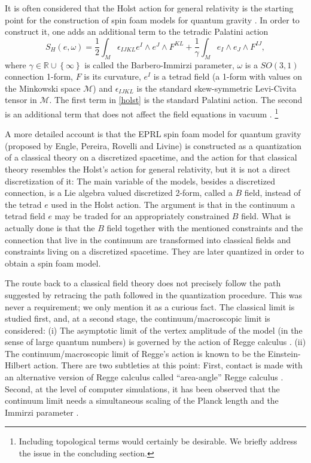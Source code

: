 \documentclass{article}
\begin{document}
It is often considered that the Holst action \cite{Holst, EPRL} for general relativity is the starting point for the construction of spin foam models for quantum gravity \cite{Perez1}. 
In order to construct it, one adds 
an additional term to the tetradic Palatini action 
\begin{equation}\label{holst}
	S_{H}(e,\omega)=\dfrac{1}{2}\int_{M}\epsilon_{IJKL}e^{I}\wedge e^{J}\wedge F^{KL}+\dfrac{1}{\gamma}\int_{M}e_{I}\wedge e_{J}\wedge F^{IJ},
\end{equation}	
where $\gamma\in\mathbb{R}\cup\left\{\infty\right\}$ is called the Barbero-Immirzi parameter, $\omega$ is a $SO(3,1)$ connection 1-form, $F$ is its curvature, $e^{I}$ is a tetrad field (a 1-form with values on the Minkowski space $\mathcal{M}$) and $\epsilon_{IJKL}$ is the standard skew-symmetric Levi-Civita tensor in $\mathcal{M}$. The first term in \eqref{holst} is the standard Palatini action. The second is an additional term that does not affect the field equations in vacuum \cite{EPRL}.%
\footnote{
Including topological terms would certainly be desirable. We briefly address the issue in the concluding section.}



A more detailed account is that the EPRL spin foam model for quantum gravity (proposed by Engle, Pereira, Rovelli and Livine) \cite{EPRL} is constructed as a quantization of a classical theory on a discretized spacetime, and the action for that classical theory resembles the Holst's action for general relativity, but it is not a direct discretization of it: 
	The main variable of the models, besides a discretized connection, is a Lie algebra valued discretized 2-form, called a $B$ field, instead of the tetrad $e$ used in the Holst action. The argument is that in the continuum a tetrad field $e$ may be traded for an appropriately constrained $B$ field. 
	What is actually done is that the $B$ field together with the mentioned constraints and the connection that live in the continuum are transformed into classical fields and constraints living on a discretized spacetime. They are later quantized in order to obtain a spin foam model. 



The route back to a classical field theory does not precisely follow the path suggested by retracing the path followed in the quantization procedure. This was never a requirement; we only mention it as a curious fact. 
The classical limit is studied first, and, at a second stage, the continuum/macroscopic limit is considered: (i) The asymptotic limit of the vertex amplitude of the model (in the sense of large quantum numbers) is governed by the action of Regge calculus \cite{Regge}. (ii) The continuum/macroscopic limit of Regge's action is known to be the Einstein-Hilbert action. There are two subtleties at this point: First, contact is made with an alternative version of Regge calculus called ``area-angle'' Regge calculus \cite{AAR}. Second, at the level of computer simulations, it has been observed that the continuum limit needs a simultaneous scaling of the Planck length and the Immirzi parameter \cite{ESFM1}. 
\end{document}
